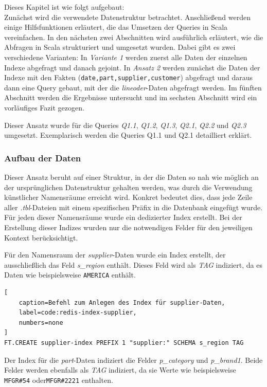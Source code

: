 Dieses Kapitel ist wie folgt aufgebaut:\\
Zunächst wird die verwendete Datenstruktur betrachtet. Anschließend werden einige Hilfsfunktionen erläutert, die das Umsetzen der Queries in Scala vereinfachen.
In den nächsten zwei Abschnitten wird ausführlich erläutert, wie die Abfragen in Scala strukturiert und umgesetzt wurden. Dabei gibt es zwei verschiedene Varianten: In \emph{Variante 1} werden zuerst alle Daten der einzelnen Indexe abgefragt und danach gejoint. In \emph{Ansatz 2} werden zunächst die Daten der Indexe mit den Fakten (\lstinline|date,part,supplier,customer|) abgefragt und daraus dann eine Query gebaut, mit der die \emph{lineoder}-Daten abgefragt werden.
Im fünften Abschnitt werden die Ergebnisse untersucht und im sechsten Abschnitt wird ein vorläufiges Fazit gezogen.

Dieser Ansatz wurde für die Queries \emph{Q1.1}, \emph{Q1.2}, \emph{Q1.3}, \emph{Q2.1}, \emph{Q2.2} und \emph{Q2.3} umgesetzt. Exemplarisch werden die Queries Q1.1 und Q2.1 detailliert erklärt.


\subsubsection{Aufbau der Daten}\label{sec:client-approach-datastructure}
Dieser Ansatz beruht auf einer Struktur, in der die Daten so nah wie möglich an der ursprünglichen Datenstruktur gehalten werden, was durch die Verwendung künstlicher Namensräume erreicht wird. Konkret bedeutet dies, dass jede Zeile aller \emph{.tbl}-Dateien mit einem spezifischen Präfix in die Datenbank eingefügt wurde. Für jeden dieser Namensräume wurde ein dedizierter Index erstellt. Bei der Erstellung dieser Indizes wurden nur die notwendigen Felder für den jeweiligen Kontext berücksichtigt.

Für den Namensraum der \emph{supplier}-Daten wurde ein Index erstellt, der ausschließlich das Feld \emph{s\_region} enthält. Dieses Feld wird als \emph{TAG} indiziert, da es Daten wie beispielsweise \lstinline|AMERICA| enthält. %

\begin{lstlisting}[
    caption=Befehl zum Anlegen des Index für supplier-Daten,
    label=code:redis-index-supplier,
    numbers=none
]
FT.CREATE supplier-index PREFIX 1 "supplier:" SCHEMA s_region TAG
\end{lstlisting}


Der Index für die \emph{part}-Daten indiziert die Felder \emph{p\_category} und \emph{p\_brand1}. Beide Felder werden ebenfalls als \emph{TAG} indiziert, da sie Werte wie beispielsweise \lstinline|MFGR#54| oder\lstinline|MFGR#2221| enthalten.

